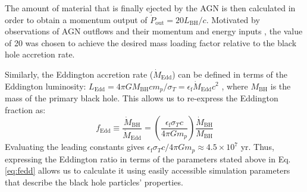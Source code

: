 \documentclass[twocolumn, linenumbers]{aastex631}
\newcommand{\eq}{Eq.\hspace{.2em}}
\newcommand{\mbh}{M_{\text{BH}}}
\newcommand{\mbhd}{\dot{M}_{\text{BH}}}
\newcommand{\fedd}{f_{\text{Edd}}}
\begin{document}
The amount of material that is finally ejected by the AGN is then calculated in order to obtain a momentum output of $\dot{P}_{\text{out}}=20L_{\text{BH}}/c$.  Motivated by observations of AGN outflows and their momentum and energy inputs \citep{Fiore2017}, the value of 20 was chosen to achieve the desired mass loading factor relative to the black hole accretion rate.




Similarly, the Eddington accretion rate ($\dot{M}_{\text{Edd}}$) can be defined in terms of the Eddington luminosity: $L_{\text{Edd}}=4\pi G\mbh cm_p/\sigma_T=\epsilon_{\text{f}} \dot{M}_{\text{Edd}}c^2$ \citep{Thomas_2019}, where $\mbh$ is the mass of the primary black hole.  This allows us to re-express the Eddington fraction as: 
\begin{equation}
    \fedd\equiv \frac{\mbhd}{\dot{M}_{\text{Edd}}}=\left(\frac{\epsilon_\text{f} \sigma_T c}{4\pi Gm_p}\right)\frac{\mbhd}{\mbh}\label{eq:fedd}
\end{equation}
Evaluating the leading constants gives $\epsilon_\text{f} \sigma_T c/4\pi Gm_p\approx 4.5\times 10^7$ yr.  Thus, expressing the Eddington ratio in terms of the parameters stated above in \eq \ref{eq:fedd} allows us to calculate it using easily accessible simulation parameters that describe the black hole particles' properties. 
\end{document}
